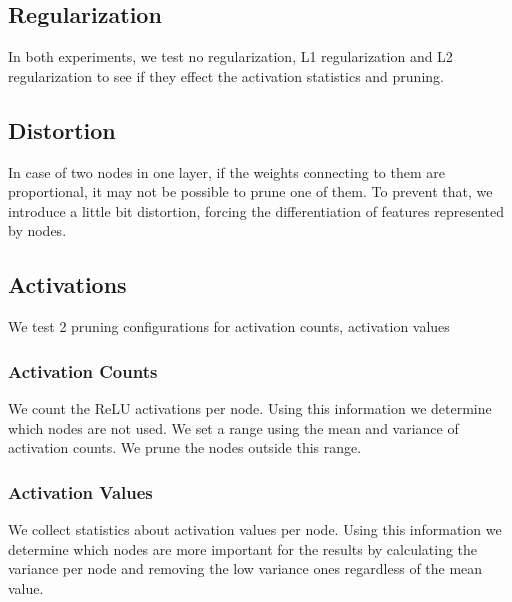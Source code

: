 \subsection{Regularization}
In both experiments, we test no regularization, L1 regularization and L2 regularization to see if they effect the activation statistics and pruning.

\subsection{Distortion}
In case of two nodes in one layer, if the weights connecting to them are proportional, it may not be possible to prune one of them. To prevent that, we introduce a little bit distortion, forcing the differentiation of features represented by nodes. 

\subsection{Activations}
We test 2 pruning configurations for activation counts, activation values 

\subsubsection{Activation Counts}
We count the ReLU activations per node. Using this information we determine which nodes are not used. We set a range using the mean and variance of activation counts. We prune the nodes outside this range.

\subsubsection{Activation Values}
We collect statistics about activation values per node. Using this information we determine which nodes are more important for the results by calculating the variance per node and removing the low variance ones regardless of the mean value.

